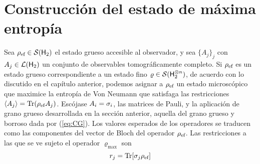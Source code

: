 \section{Construcción del estado de máxima entropía}


Sea $\rho_{\text{ef}}\in\mathcal{S}({\sf H}_{2})$ el estado grueso accesible al observador, y sea $\{A_{j}\}_{j}$ con $A_{j}\in\mathcal{L}({\sf H}_{2})$ un conjunto de observables tomográficamente completo.
Si $\rho_{\text{ef}}$ es un estado grueso correspondiente a un estado fino $\varrho\in\mathcal{S}({\sf H}_{2}^{\otimes n})$, de acuerdo con lo discutido en el capítulo anterior, podemos asignar a $\rho_{\text{ef}}$ un estado microscópico que maximice la entropía de Von Neumann que satisfaga las restricciones $\expval{A_{j}}=\Tr(\rho_{\text{ef}} A_{j})$.
Escójase ${A_{i}}={\sigma_{i}}$, las matrices de Pauli, y la aplicación de grano grueso desarrollada en la sección anterior, aquella del grano grueso y borroso dada por (\ref{eq:CG}). Los valores esperados de los operadores se traducen como las componentes del vector de Bloch del operador $\rho_{\text{ef}}$. Las restricciones a las que se ve sujeto el operador $\varrho_{\max}$ son
\begin{equation}\label{eq:Restrictions}
    r_{j}=\Tr[\sigma_{j}\rho_{\text{ef}}]
\end{equation}

